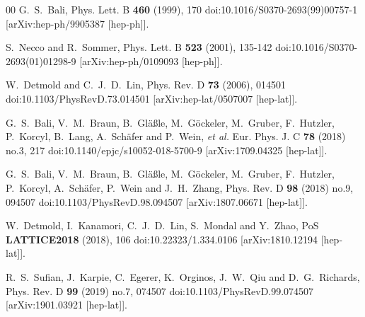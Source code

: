 \documentclass[preprint,12pt]{elsarticle}
\begin{document}
\begin{thebibliography}{00}
G.~S.~Bali,
Phys. Lett. B \textbf{460} (1999), 170
doi:10.1016/S0370-2693(99)00757-1
[arXiv:hep-ph/9905387 [hep-ph]].

S.~Necco and R.~Sommer,
Phys. Lett. B \textbf{523} (2001), 135-142
doi:10.1016/S0370-2693(01)01298-9
[arXiv:hep-ph/0109093 [hep-ph]].

W.~Detmold and C.~J.~D.~Lin,
Phys. Rev. D \textbf{73} (2006), 014501
doi:10.1103/PhysRevD.73.014501
[arXiv:hep-lat/0507007 [hep-lat]].

G.~S.~Bali, V.~M.~Braun, B.~Gl\"a\ss{}le, M.~G\"ockeler, M.~Gruber, F.~Hutzler, P.~Korcyl, B.~Lang, A.~Sch\"afer and P.~Wein, \textit{et al.}
Eur. Phys. J. C \textbf{78} (2018) no.3, 217
doi:10.1140/epjc/s10052-018-5700-9
[arXiv:1709.04325 [hep-lat]].

G.~S.~Bali, V.~M.~Braun, B.~Gl\"a\ss{}le, M.~G\"ockeler, M.~Gruber, F.~Hutzler, P.~Korcyl, A.~Sch\"afer, P.~Wein and J.~H.~Zhang,
Phys. Rev. D \textbf{98} (2018) no.9, 094507
doi:10.1103/PhysRevD.98.094507
[arXiv:1807.06671 [hep-lat]].

W.~Detmold, I.~Kanamori, C.~J.~D.~Lin, S.~Mondal and Y.~Zhao,
PoS \textbf{LATTICE2018} (2018), 106
doi:10.22323/1.334.0106
[arXiv:1810.12194 [hep-lat]].

R.~S.~Sufian, J.~Karpie, C.~Egerer, K.~Orginos, J.~W.~Qiu and D.~G.~Richards,
Phys. Rev. D \textbf{99} (2019) no.7, 074507
doi:10.1103/PhysRevD.99.074507
[arXiv:1901.03921 [hep-lat]].


\end{thebibliography}
\end{document}
